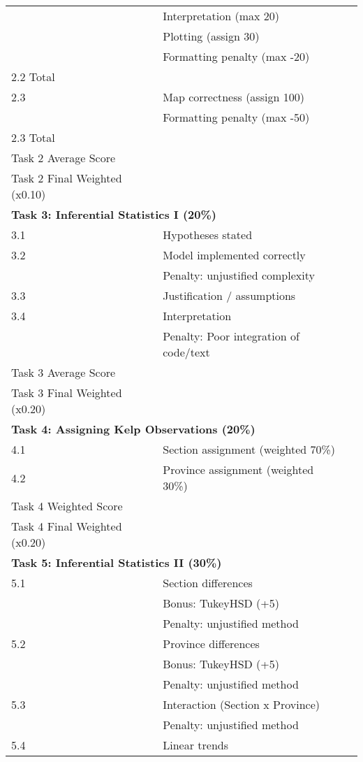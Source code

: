 \documentclass[11pt,a4paper]{article}
\begin{document}
\begin{longtable}{p{}p{}p{}}
    & Interpretation (max 20) &  \\
    & Plotting (assign 30) &  \\
    & Formatting penalty (max -20) &  \\
2.2 Total & & \\
2.3 & Map correctness (assign 100) & \\
    & Formatting penalty (max -50) & \\
2.3 Total & & \\
Task 2 Average Score & & \\
Task 2 Final Weighted (x0.10) & & \\
\midrule
\multicolumn{3}{l}{\textbf{Task 3: Inferential Statistics I (20\%)}} \\
3.1 & Hypotheses stated & \\
3.2 & Model implemented correctly & \\
    & Penalty: unjustified complexity & \\
3.3 & Justification / assumptions & \\
3.4 & Interpretation & \\
    & Penalty: Poor integration of code/text & \\
Task 3 Average Score & & \\
Task 3 Final Weighted (x0.20) & & \\
\midrule
\multicolumn{3}{l}{\textbf{Task 4: Assigning Kelp Observations (20\%)}} \\
4.1 & Section assignment (weighted 70\%) & \\
4.2 & Province assignment (weighted 30\%) & \\
Task 4 Weighted Score & & \\
Task 4 Final Weighted (x0.20) & & \\
\midrule
\multicolumn{3}{l}{\textbf{Task 5: Inferential Statistics II (30\%)}} \\
5.1 & Section differences & \\
    & Bonus: TukeyHSD (+5) & \\
    & Penalty: unjustified method & \\
5.2 & Province differences & \\
    & Bonus: TukeyHSD (+5) & \\
    & Penalty: unjustified method & \\
5.3 & Interaction (Section x Province) & \\
    & Penalty: unjustified method & \\
5.4 & Linear trends & \\

\end{longtable}
\end{document}
